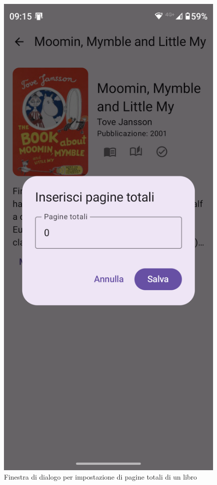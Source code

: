 \documentclass{article}
\begin{document}
\begin{figure}[H]
  \centering
  \includegraphics[width=0.6\linewidth]{set-pages.png}
  \caption{Finestra di dialogo per impostazione di pagine totali di un libro}
  \label{fig:sitemap}
\end{figure}
\end{document}
